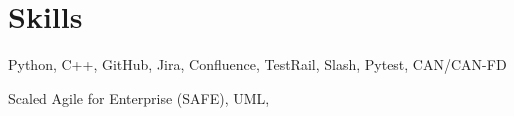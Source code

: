 \documentclass[11pt]{article} %
\begin{document}
\section{Skills}
\begin{description}[itemsep=0pt]
	\item[Technologies] Python, C++, GitHub, Jira, Confluence, TestRail, Slash, Pytest, CAN/CAN-FD
	\item[Practices] Scaled Agile for Enterprise (SAFE), UML, 
\end{description}
\end{document}
